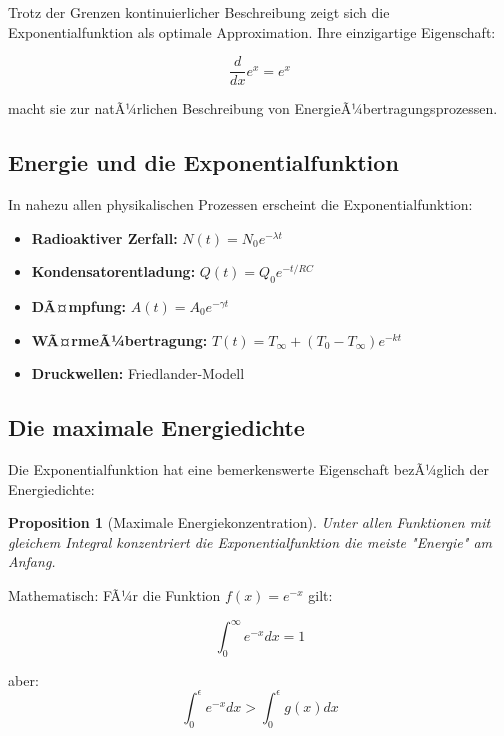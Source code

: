 ﻿\documentclass[12pt,a4paper]{article}
\newtheorem{proposition}[theorem]{Proposition}
\theoremstyle{definition}
\theoremstyle{remark}
\begin{document}
Trotz der Grenzen kontinuierlicher Beschreibung zeigt sich die Exponentialfunktion als optimale Approximation. Ihre einzigartige Eigenschaft:

\begin{equation}
\frac{d}{dx} e^x = e^x
\end{equation}

macht sie zur natÃ¼rlichen Beschreibung von EnergieÃ¼bertragungsprozessen.

\subsection{Energie und die Exponentialfunktion}

In nahezu allen physikalischen Prozessen erscheint die Exponentialfunktion:

\begin{itemize}
\item \textbf{Radioaktiver Zerfall:} $N(t) = N_0 e^{-\lambda t}$
\item \textbf{Kondensatorentladung:} $Q(t) = Q_0 e^{-t/RC}$
\item \textbf{DÃ¤mpfung:} $A(t) = A_0 e^{-\gamma t}$
\item \textbf{WÃ¤rmeÃ¼bertragung:} $T(t) = T_\infty + (T_0 - T_\infty)e^{-kt}$
\item \textbf{Druckwellen:} Friedlander-Modell
\end{itemize}

\subsection{Die maximale Energiedichte}

Die Exponentialfunktion hat eine bemerkenswerte Eigenschaft bezÃ¼glich der Energiedichte:

\begin{proposition}[Maximale Energiekonzentration]
Unter allen Funktionen mit gleichem Integral konzentriert die Exponentialfunktion die meiste "Energie" am Anfang.
\end{proposition}

Mathematisch: FÃ¼r die Funktion $f(x) = e^{-x}$ gilt:

\begin{equation}
\int_0^\infty e^{-x} dx = 1
\end{equation}

aber:
\begin{equation}
\int_0^{\epsilon} e^{-x} dx > \int_0^{\epsilon} g(x) dx
\end{equation}
\end{document}
